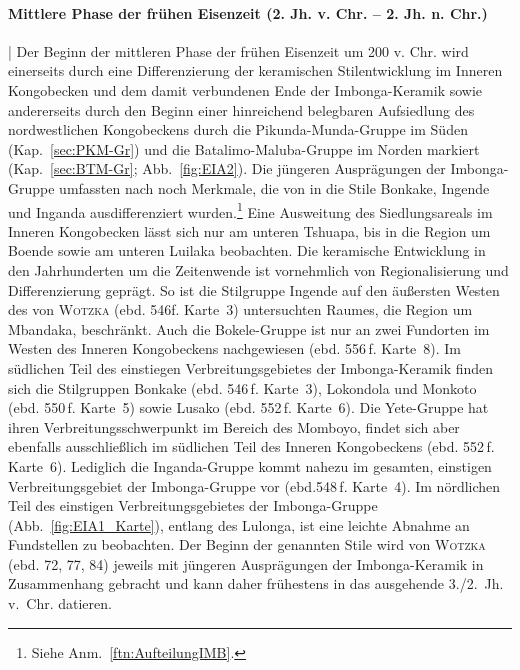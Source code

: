 \paragraph{Mittlere Phase der frühen Eisenzeit (2. Jh. v. Chr. -- 2. Jh. n. Chr.)}\hspace{-.5em}|\hspace{.5em}%
Der Beginn der mittleren Phase der frühen Eisenzeit um 200 v. Chr. wird einerseits durch eine Differenzierung der keramischen Stilentwicklung im Inneren Kongobecken und dem damit verbundenen Ende der Imbonga-Keramik sowie andererseits durch den Beginn einer hinreichend belegbaren Aufsiedlung des nordwestlichen Kongobeckens durch die Pikunda-Munda-Gruppe im Süden (Kap.~\ref{sec:PKM-Gr}) und die Batalimo-Maluba-Gruppe im Norden markiert (Kap.~\ref{sec:BTM-Gr}; Abb.~\ref{fig:EIA2}). Die jüngeren Ausprägungen der Imbonga-Gruppe umfassten nach \textcite{Eggert.1983} noch Merkmale, die von \textcite{Wotzka.1995} in die Stile Bonkake, Ingende und Inganda ausdifferenziert wurden.\footnote{Siehe Anm.~\ref{ftn:AufteilungIMB}.} Eine Ausweitung des Siedlungsareals im Inneren Kongobecken lässt sich nur am unteren Tshuapa, bis in die Region um Boende sowie am unteren Luilaka beobachten. Die keramische Entwicklung in den Jahrhunderten um die Zeitenwende ist vornehmlich von Regionalisierung und Differenzierung geprägt. So ist die Stilgruppe Ingende auf den äußersten Westen des von \textsc{Wotzka} (ebd. 546f. Karte~3) untersuchten Raumes, die Region um Mbandaka, beschränkt. Auch die Bokele-Gruppe ist nur an zwei Fundorten im Westen des Inneren Kongobeckens nachgewiesen (ebd. 556\,f. Karte~8). Im südlichen Teil des einstiegen Verbreitungsgebietes der Imbonga-Keramik finden sich die Stilgruppen Bonkake (ebd. 546\,f. Karte~3), Lokondola und Monkoto (ebd. 550\,f. Karte~5) sowie Lusako (ebd. 552\,f. Karte~6). Die Yete-Gruppe hat ihren Verbreitungsschwerpunkt im Bereich des Momboyo, findet sich aber ebenfalls ausschließlich im südlichen Teil des Inneren Kongobeckens (ebd. 552\,f. Karte~6). Lediglich die Inganda-Gruppe kommt nahezu im gesamten, einstigen Verbreitungsgebiet der Imbonga-Gruppe vor (ebd.548\,f. Karte~4). Im nördlichen Teil des einstigen Verbreitungsgebietes der Imbonga-Gruppe (Abb.~\ref{fig:EIA1_Karte}), entlang des Lulonga, ist eine leichte Abnahme an Fundstellen zu beobachten. Der Beginn der genannten Stile wird von \textsc{Wotzka} (ebd. 72, 77, 84) jeweils mit jüngeren Ausprägungen der Imbonga-Keramik in Zusammenhang gebracht und kann daher frühestens in das ausgehende 3./2.~Jh. v.~Chr. datieren.


